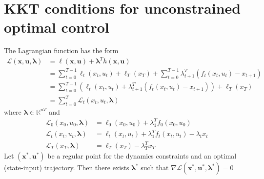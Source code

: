 \documentclass[openany]{book}
\newcommand{\R}{\mathbb{R}}               %
\theoremstyle{definition}
\theoremstyle{remark}
\begin{document}
\section{KKT conditions for unconstrained optimal control}

The Lagrangian function has the form 
\begin{align*}
    \mathcal{L}(\mathbf{x,u,\lambda}) &= \ell(\mathbf{x,u})+\boldsymbol{\lambda}^Th(\mathbf{x,u}) \\
    &= \displaystyle\sum_{t=0}^{T-1}\ell_t(x_t,u_t)+\ell_T(x_T) + \displaystyle\sum_{t=0}^{T-1}\lambda^T_{t+1}(f_t(x_t,u_t)-x_{t+1}) \\
    &= \displaystyle\sum_{t=0}^{T-1}\left(\ell_t(x_t,u_t)+\lambda^T_{t+1}(f_t(x_t,u_t)-x_{t+1})\right)+\ell_T(x_T) \\
    &=\displaystyle\sum_{t=0}^{T}\mathcal{L}_t(x_t,u_t,\boldsymbol{\lambda})
\end{align*}
where $\boldsymbol{\lambda}\in\R^{nT}$ and 
\begin{align*}
    \mathcal{L}_0(x_0,u_0,\boldsymbol{\lambda}) &= \ell_0(x_0,u_0)+\lambda_1^T f_0(x_0,u_0)\\
    \mathcal{L}_t(x_t,u_t,\boldsymbol{\lambda}) &= \ell_t(x_t,u_t)+\lambda_1^T f_t(x_t,u_t)-\lambda_tx_t\\
    \mathcal{L}_T(x_T,\boldsymbol{\lambda}) &= \ell_T(x_T) - \lambda_T^Tx_T
\end{align*}
Let $(\mathbf{x}^*,\mathbf{u}^*)$ be a regular point for the dynamics constraints and an optimal (state-input) trajectory. Then there exists $\boldsymbol{\lambda}^*$ such that $\nabla \mathcal{L}(\mathbf{x}^*,\mathbf{u}^*,\boldsymbol{\lambda}^*)=0$ 
\end{document}
